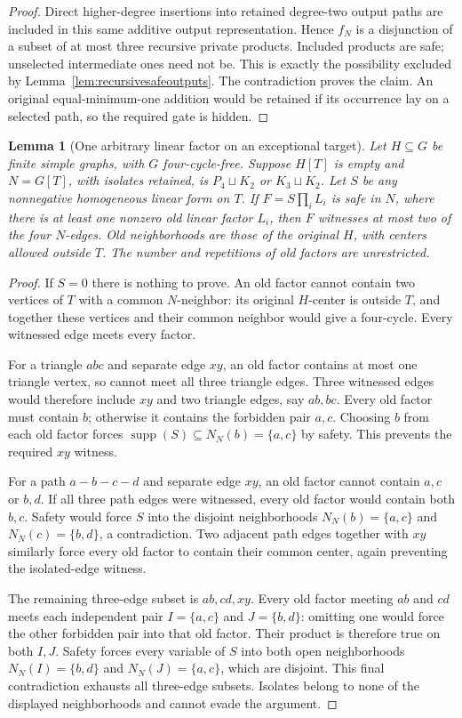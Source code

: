 \documentclass[11pt]{article}
\newcommand{\supp}{\operatorname{supp}}
\newtheorem{lemma}[theorem]{Lemma}
\theoremstyle{definition}
\theoremstyle{remark}
\begin{document}
\begin{proof}
Direct higher-degree insertions into retained degree-two output paths are included in this same additive output representation. Hence $f_N$ is a disjunction of a subset of at most three recursive private products. Included products are safe; unselected intermediate ones need not be. This is exactly the possibility excluded by Lemma~\ref{lem:recursivesafeoutputs}. The contradiction proves the claim. An original equal-minimum-one addition would be retained if its occurrence lay on a selected path, so the required gate is hidden.
\end{proof}

\begin{lemma}[One arbitrary linear factor on an exceptional target]\label{lem:onearbitraryfactor}
Let $H\subseteq G$ be finite simple graphs, with $G$ four-cycle-free. Suppose $H[T]$ is empty and $N=G[T]$, with isolates retained, is $P_4\sqcup K_2$ or $K_3\sqcup K_2$. Let $S$ be any nonnegative homogeneous linear form on $T$. If $F=S\prod_iL_i$ is safe in $N$, where there is at least one nonzero old linear factor $L_i$, then $F$ witnesses at most two of the four $N$-edges. Old neighborhoods are those of the original $H$, with centers allowed outside $T$. The number and repetitions of old factors are unrestricted.
\end{lemma}
\begin{proof}
If $S=0$ there is nothing to prove. An old factor cannot contain two vertices of $T$ with a common $N$-neighbor: its original $H$-center is outside $T$, and together these vertices and their common neighbor would give a four-cycle. Every witnessed edge meets every factor.

For a triangle $abc$ and separate edge $xy$, an old factor contains at most one triangle vertex, so cannot meet all three triangle edges. Three witnessed edges would therefore include $xy$ and two triangle edges, say $ab,bc$. Every old factor must contain $b$; otherwise it contains the forbidden pair $a,c$. Choosing $b$ from each old factor forces $\supp(S)\subseteq N_N(b)=\{a,c\}$ by safety. This prevents the required $xy$ witness.

For a path $a-b-c-d$ and separate edge $xy$, an old factor cannot contain $a,c$ or $b,d$. If all three path edges were witnessed, every old factor would contain both $b,c$. Safety would force $S$ into the disjoint neighborhoods $N_N(b)=\{a,c\}$ and $N_N(c)=\{b,d\}$, a contradiction. Two adjacent path edges together with $xy$ similarly force every old factor to contain their common center, again preventing the isolated-edge witness.

The remaining three-edge subset is $ab,cd,xy$. Every old factor meeting $ab$ and $cd$ meets each independent pair $I=\{a,c\}$ and $J=\{b,d\}$: omitting one would force the other forbidden pair into that old factor. Their product is therefore true on both $I,J$. Safety forces every variable of $S$ into both open neighborhoods $N_N(I)=\{b,d\}$ and $N_N(J)=\{a,c\}$, which are disjoint. This final contradiction exhausts all three-edge subsets. Isolates belong to none of the displayed neighborhoods and cannot evade the argument.
\end{proof}
\end{document}
